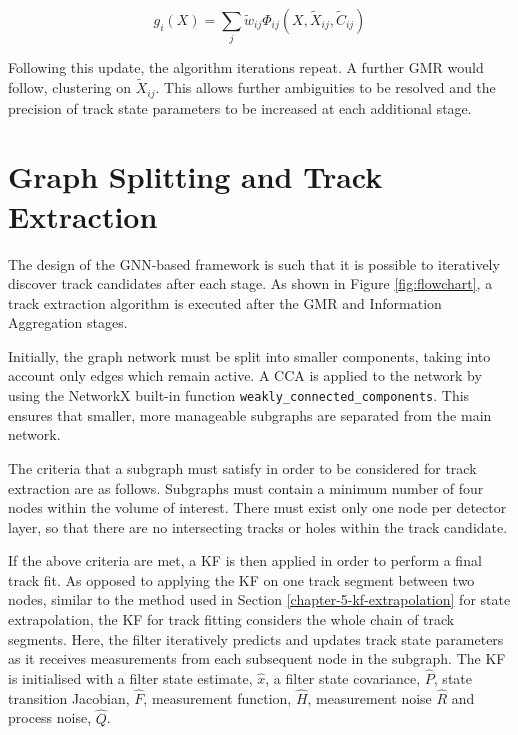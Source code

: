 \begin{equation}
g_i(X) = \sum_{j} \widetilde{w}_{ij}\Phi_{ij}(X, \widetilde{X}_{ij}, \widetilde{C}_{ij})
\label{eqn:updated-gaussian-mixture}
\end{equation}

Following this update, the algorithm iterations repeat. A further GMR would follow, clustering on $\widetilde{X}_{ij}$. This allows further ambiguities to be resolved and the precision of track state parameters to be increased at each additional stage.






\section{Graph Splitting and Track Extraction}
\label{gnn-track-extration}

The design of the GNN-based framework is such that it is possible to iteratively discover track candidates after each stage. As shown in Figure \ref{fig:flowchart}, a track extraction algorithm is executed after the GMR and Information Aggregation stages.

Initially, the graph network must be split into smaller components, taking into account only edges which remain active. A CCA is applied to the network by using the NetworkX built-in function \texttt{weakly\_connected\_components}. This ensures that smaller, more manageable subgraphs are separated from the main network.

The criteria that a subgraph must satisfy in order to be considered for track extraction are as follows. Subgraphs must contain a minimum number of four nodes within the volume of interest. There must exist only one node per detector layer, so that there are no intersecting tracks or holes within the track candidate. 

If the above criteria are met, a KF is then applied in order to perform a final track fit. As opposed to applying the KF on one track segment between two nodes, similar to the method used in Section \ref{chapter-5-kf-extrapolation} for state extrapolation, the KF for track fitting considers the whole chain of track segments. Here, the filter iteratively predicts and updates track state parameters as it receives measurements from each subsequent node in the subgraph. The KF is initialised with a filter state estimate, $\hat{x}$, a filter state covariance, $\hat{P}$, state transition Jacobian, $\hat{F}$, measurement function, $\hat{H}$, measurement noise $\hat{R}$ and process noise, $\hat{Q}$.

